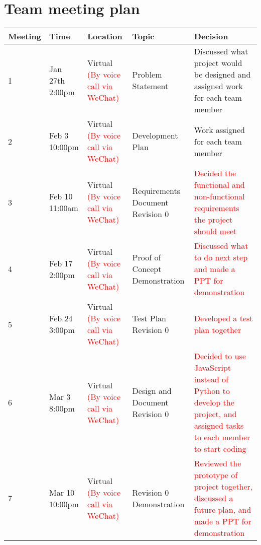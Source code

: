 \documentclass{article}
\begin{document}
\section{Team meeting plan}
\begin{table}[H]
    \begin{tabularx}{\textwidth}{|X|X|X|X|X|}
        \hline
         Meeting & Time & Location & Topic & Decision\\
        \hline
        1 & Jan 27th 2:00pm & Virtual \textcolor{red}{(By voice call via WeChat)} & Problem Statement& Discussed what project would be designed and assigned work for each team member\\
        \hline
        2 & Feb 3 10:00pm & Virtual \textcolor{red}{(By voice call via WeChat)} & Development Plan & Work assigned for each team member\\ 
        \hline
        3 & Feb 10 11:00am & Virtual \textcolor{red}{(By voice call via WeChat)}& Requirements Document Revision 0 & \textcolor{red}{Decided the functional and non-functional requirements the project should meet}\\
        \hline
        4 & Feb 17 2:00pm & Virtual \textcolor{red}{(By voice call via WeChat)}& Proof of Concept Demonstration & \textcolor{red}{Discussed what to do next step and made a PPT for demonstration}\\
        \hline
        5 & Feb 24 3:00pm & Virtual \textcolor{red}{(By voice call via WeChat)}& Test Plan Revision 0 & \textcolor{red}{Developed a test plan together}\\
        \hline
        6 & Mar 3 8:00pm & Virtual \textcolor{red}{(By voice call via WeChat)}& Design and Document Revision 0 & \textcolor{red}{Decided to use JavaScript instead of Python to develop the project, and assigned tasks to each member to start coding}\\
        \hline
        7 & Mar 10 10:00pm & Virtual \textcolor{red}{(By voice call via WeChat)}& Revision 0 Demonstration & \textcolor{red}{Reviewed the prototype of project together, discussed a future plan, and made a PPT for demonstration}\\
        \hline
   \end{tabularx}
\end{table}
\end{document}
